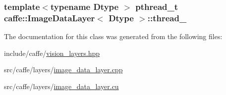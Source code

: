 \hypertarget{classcaffe_1_1_image_data_layer_a4381ef240bd59045142746a3142e7583}{
\subsubsection[{thread\+\_\+}]{\setlength{\rightskip}{0pt plus 5cm}template$<$typename Dtype $>$ pthread\+\_\+t {\bf caffe\+::\+Image\+Data\+Layer}$<$ Dtype $>$\+::thread\+\_\+\hspace{0.3cm}{\ttfamily [protected]}}}\label{classcaffe_1_1_image_data_layer_a4381ef240bd59045142746a3142e7583}


The documentation for this class was generated from the following files\+:\begin{DoxyCompactItemize}
\item 
include/caffe/\hyperlink{vision__layers_8hpp}{vision\+\_\+layers.\+hpp}\item 
src/caffe/layers/\hyperlink{image__data__layer_8cpp}{image\+\_\+data\+\_\+layer.\+cpp}\item 
src/caffe/layers/\hyperlink{image__data__layer_8cu}{image\+\_\+data\+\_\+layer.\+cu}\end{DoxyCompactItemize}
